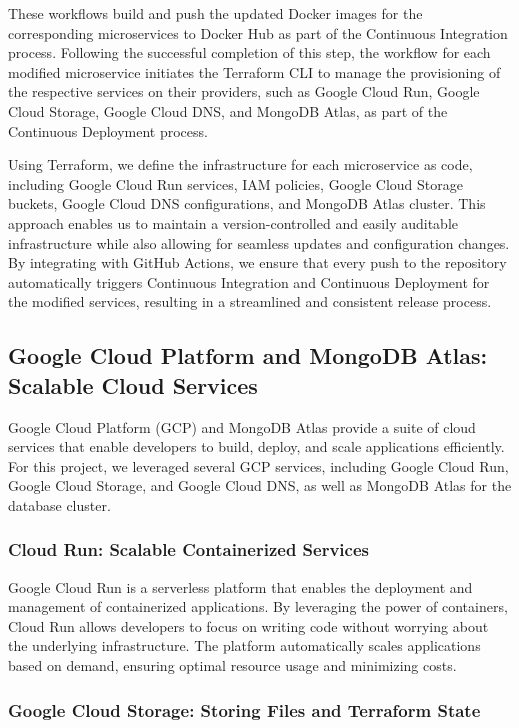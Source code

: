 \documentclass[a4paper,fleqn]{cas-sc}
\begin{document}
These workflows build and push the updated Docker images for the corresponding microservices to Docker Hub as part of the Continuous Integration process. Following the successful completion of this step, the workflow for each modified microservice initiates the Terraform CLI to manage the provisioning of the respective services on their providers, such as Google Cloud Run, Google Cloud Storage, Google Cloud DNS, and MongoDB Atlas, as part of the Continuous Deployment process.

Using Terraform, we define the infrastructure for each microservice as code, including Google Cloud Run services, IAM policies, Google Cloud Storage buckets, Google Cloud DNS configurations, and MongoDB Atlas cluster. This approach enables us to maintain a version-controlled and easily auditable infrastructure while also allowing for seamless updates and configuration changes. By integrating with GitHub Actions, we ensure that every push to the repository automatically triggers Continuous Integration and Continuous Deployment for the modified services, resulting in a streamlined and consistent release process.

\subsection{Google Cloud Platform and MongoDB Atlas: Scalable Cloud Services}

Google Cloud Platform (GCP) and MongoDB Atlas provide a suite of cloud services that enable developers to build, deploy, and scale applications efficiently. For this project, we leveraged several GCP services, including Google Cloud Run, Google Cloud Storage, and Google Cloud DNS, as well as MongoDB Atlas for the database cluster.

\subsubsection{Cloud Run: Scalable Containerized Services}

Google Cloud Run is a serverless platform that enables the deployment and management of containerized applications. By leveraging the power of containers, Cloud Run allows developers to focus on writing code without worrying about the underlying infrastructure. The platform automatically scales applications based on demand, ensuring optimal resource usage and minimizing costs.

\subsubsection{Google Cloud Storage: Storing Files and Terraform State}
\end{document}
